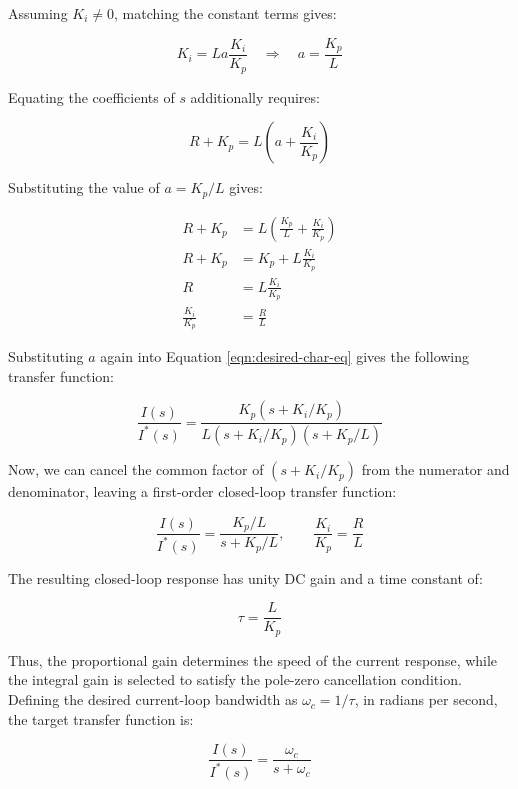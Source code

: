 \documentclass{article}
\begin{document}
Assuming $K_i \neq 0$, matching the constant terms gives:

\begin{equation}
    K_i = La\frac{K_i}{K_p} \quad\Rightarrow\quad a = \frac{K_p}{L}
\end{equation}

Equating the coefficients of $s$ additionally requires:

\begin{equation}
    R + K_p = L\left(a + \frac{K_i}{K_p}\right)
\end{equation}

Substituting the value of $a = K_p/L$ gives:

\begin{align}
    R + K_p &= L\left(\frac{K_p}{L} + \frac{K_i}{K_p}\right) \\
    R + K_p &= K_p + L\frac{K_i}{K_p} \\
    R & = L\frac{K_i}{K_p} \\
    \frac{K_i}{K_p} &= \frac{R}{L}
\end{align}

Substituting $a$ again into Equation \ref{eqn:desired-char-eq} gives the following transfer function:

\begin{equation}
    \frac{I(s)}{I^*(s)} = \frac{K_p(s + K_i/K_p)}{L(s + K_i/K_p)(s + K_p/L)}
\end{equation}

Now, we can cancel the common factor of $(s + K_i/K_p)$ from the numerator and denominator, leaving a first-order closed-loop transfer function:

\begin{equation}
    \frac{I(s)}{I^*(s)} = \frac{K_p/L}{s + K_p/L}, \qquad \frac{K_i}{K_p} = \frac{R}{L}
\end{equation}

The resulting closed-loop response has unity DC gain and a time constant of:

\begin{equation}
    \tau = \frac{L}{K_p}
\end{equation}

Thus, the proportional gain determines the speed of the current response, while the integral gain is selected to satisfy the pole-zero cancellation condition. Defining the desired current-loop bandwidth as $\omega_c = 1/\tau$, in radians per second, the target transfer function is:

\begin{equation}
    \frac{I(s)}{I^*(s)} = \frac{\omega_c}{s + \omega_c}
\end{equation}
\end{document}
